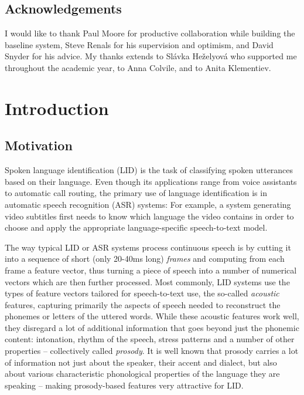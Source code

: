 \documentclass[bsc,frontabs,twoside,singlespacing,parskip,deptreport]{infthesis}
\begin{document}
\section*{Acknowledgements}{
  I would like to thank Paul Moore for productive collaboration while building the baseline system, Steve Renals for his supervision and optimism, and David Snyder for his advice. 
  My thanks extends to Sl\'avka He\v{z}elyov\'a who supported me throughout the academic year, to Anna Colvile, and to Anita Klementiev.
}

\tableofcontents

\chapter{Introduction}{
  \label{chap:Introduction}
  
  \section{Motivation}{
    Spoken language identification (LID) is the task of classifying spoken utterances based on their language.
    Even though its applications range from voice assistants to automatic call routing, the primary use of language identification is in automatic speech recognition (ASR) systems: For example, a system generating video subtitles first needs to know which language the video contains in order to choose and apply the appropriate language-specific speech-to-text model.

    The way typical LID or ASR systems process continuous speech is by cutting it into a sequence of short (only 20-40ms long) \textit{frames} and computing from each frame a feature vector, thus turning a piece of speech into a number of numerical vectors which are then further processed.
    Most commonly, LID systems use the types of feature vectors tailored for speech-to-text use, the so-called \textit{acoustic} features, capturing primarily the aspects of speech needed to reconstruct the phonemes or letters of the uttered words.
    While these acoustic features work well, they disregard a lot of additional information that goes beyond just the phonemic content: intonation, rhythm of the speech, stress patterns and a number of other properties -- collectively called \textit{prosody}. It is well known that prosody carries a lot of information not just about the speaker, their accent and dialect, but also about various characteristic phonological properties of the language they are speaking -- making prosody-based features very attractive for LID.
    
}}
\end{document}

